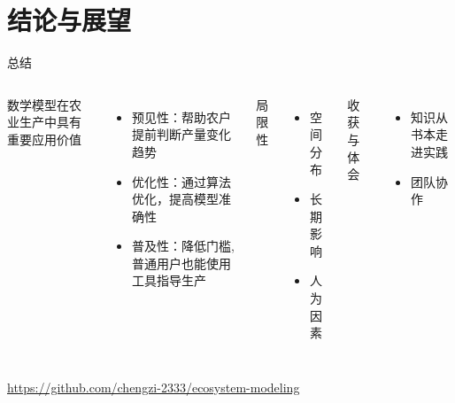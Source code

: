\documentclass[aspectratio=169, compress]{ctexbeamer}
\begin{document}
\section{结论与展望}

\begin{frame}{总结}
    \begin{columns}
        数学模型在农业生产中具有重要应用价值
        \begin{itemize}
            \item 预见性：帮助农户提前判断产量变化趋势
            \item 优化性：通过算法优化，提高模型准确性
            \item 普及性：降低门槛,普通用户也能使用工具指导生产
        \end{itemize}
        \pause

        局限性
        \begin{itemize}
            \item 空间分布
            \item 长期影响
            \item 人为因素
        \end{itemize}
        \vspace{1em}
        \pause

        收获与体会
        \begin{itemize}
            \item 知识从书本走进实践
            \item 团队协作
        \end{itemize}
        \vspace{1em}
        \pause
    \end{columns}
    \vspace{1em}
\end{frame}

\begin{frame}
    \begin{center}

        \vspace{1em}

        \url{https://github.com/chengzi-2333/ecosystem-modeling}
    \end{center}
\end{frame}
\end{document}
